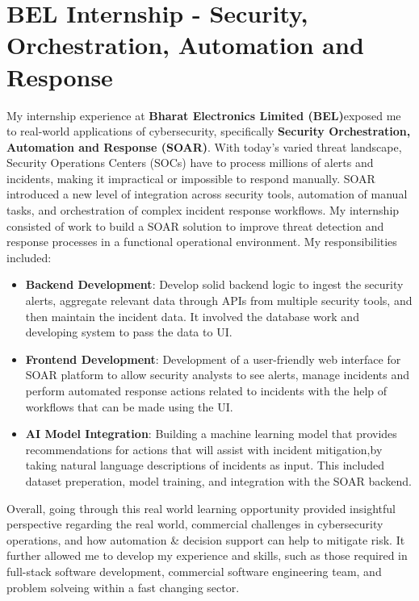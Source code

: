 \section{BEL Internship - Security, Orchestration, Automation and Response}
My internship experience at \textbf{Bharat Electronics Limited (BEL)}exposed me to real-world applications of cybersecurity, specifically \textbf{Security Orchestration, Automation and Response (SOAR)}. With today's varied threat landscape, Security Operations Centers (SOCs) have to process millions of alerts and incidents, making it impractical or impossible to respond manually. SOAR introduced a new level of integration across security tools, automation of manual tasks, and orchestration of complex incident response workflows. My internship consisted of work to build a SOAR solution to improve threat detection and response processes in a functional operational environment. My responsibilities included:

\begin{itemize}
    \item \textbf{Backend Development}: Develop solid backend logic to ingest the security alerts, aggregate relevant data through APIs from multiple security tools, and then maintain the incident data.  It involved the database work and developing system to pass the data to UI.
    \item \textbf{Frontend Development}: Development of a user-friendly web interface for SOAR platform to allow security analysts to see alerts, manage incidents and perform automated response actions related to incidents with the help of workflows that can be made using the UI.
    \item \textbf{AI Model Integration}: Building a machine learning model that provides recommendations for actions that will assist with incident mitigation,by taking natural language descriptions of incidents as input. This included dataset preperation, model training, and integration with the SOAR backend.
\end{itemize}
Overall, going through this real world learning opportunity provided insightful perspective regarding the real world, commercial challenges in cybersecurity operations, and how automation \& decision support can help to mitigate risk. It further allowed me to develop my experience and skills, such as those required in full-stack software development, commercial software engineering team, and problem solveing within a fast changing sector. 